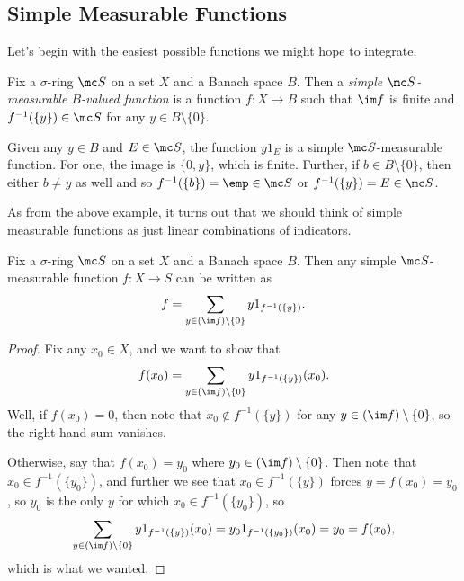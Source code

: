 \documentclass[../notes.tex]{subfiles}
\begin{document}
\subsection{Simple Measurable Functions}
Let's begin with the easiest possible functions we might hope to integrate.
\begin{definition}
	Fix a $\sigma$-ring $\mc S$ on a set $X$ and a Banach space $B$. Then a \textit{simple $\mc S$-measurable $B$-valued function} is a function $f\colon X\to B$ such that $\im f$ is finite and $f^{-1}(\{y\})\in\mc S$ for any $y\in B\setminus\{0\}$.
\end{definition}
\begin{example} \label{ex:indicator-is-simple}
	Given any $y\in B$ and $E\in\mc S$, the function $y1_E$ is a simple $\mc S$-measurable function. For one, the image is $\{0,y\}$, which is finite. Further, if $b\in B\setminus\{0\}$, then either $b\ne y$ as well and so $f^{-1}(\{b\})=\emp\in\mc S$ or $f^{-1}(\{y\})=E\in\mc S$.
\end{example}
As from the above example, it turns out that we should think of simple measurable functions as just linear combinations of indicators.
\begin{lemma} \label{lem:simple-is-linear-combo-of-chars}
	Fix a $\sigma$-ring $\mc S$ on a set $X$ and a Banach space $B$. Then any simple $\mc S$-measurable function $f\colon X\to S$ can be written as
	\[f=\sum_{y\in(\im f)\setminus\{0\}}y1_{f^{-1}(\{y\})}.\]
\end{lemma}
\begin{proof}
	Fix any $x_0\in X$, and we want to show that
	\[f(x_0)=\sum_{y\in(\im f)\setminus\{0\}}y1_{f^{-1}(\{y\})}(x_0).\]
	Well, if $f(x_0)=0$, then note that $x_0\notin f^{-1}(\{y\})$ for any $y\in(\im f)\setminus\{0\}$, so the right-hand sum vanishes.
	
	Otherwise, say that $f(x_0)=y_0$ where $y_0\in(\im f)\setminus\{0\}$. Then note that $x_0\in f^{-1}(\{y_0\})$, and further we see that $x_0\in f^{-1}(\{y\})$ forces $y=f(x_0)=y_0$, so $y_0$ is the only $y$ for which $x_0\in f^{-1}(\{y_0\})$, so
	\[\sum_{y\in(\im f)\setminus\{0\}}y1_{f^{-1}(\{y\})}(x_0)=y_01_{f^{-1}(\{y_0\})}(x_0)=y_0=f(x_0),\]
	which is what we wanted.
\end{proof}
\end{document}
